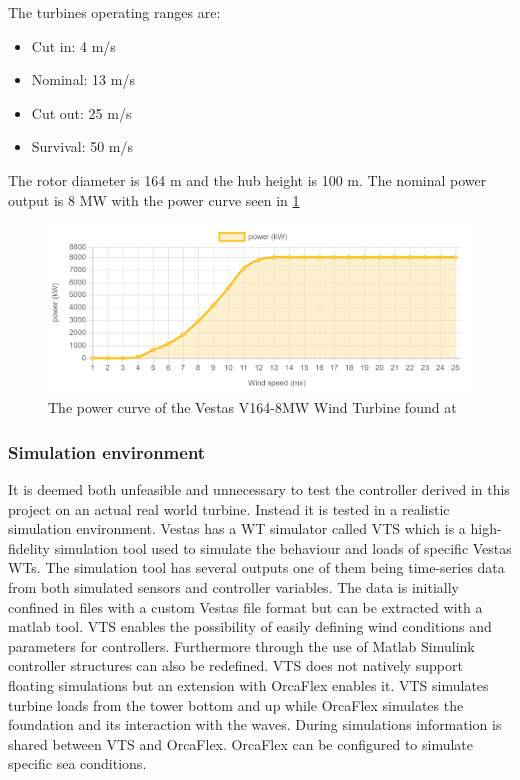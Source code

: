 The turbines operating ranges are:
\begin{itemize}
	\item Cut in: 4 m/s
	\item Nominal: 13 m/s
	\item Cut out: 25 m/s
	\item Survival: 50 m/s
\end{itemize}
The rotor diameter is 164 m and the hub height is 100 m. The nominal power output is 8 MW with the power curve seen in \cref{fig:v164_8mw_pc}
\begin{figure}[ht]
	\centering
	\includegraphics[width=0.95\linewidth]{Graphics/v164-8mw_powerCurve.PNG}
	\caption{The power curve of the Vestas V164-8MW Wind Turbine found at \cite{LucasBauer}}
	\label{fig:v164_8mw_pc}
\end{figure}

\subsubsection{Simulation environment}
It is deemed both unfeasible and unnecessary to test the controller derived in this project on an actual real world turbine. Instead it is tested in a realistic simulation environment. Vestas has a WT simulator called VTS which is a high-fidelity simulation tool used to simulate the behaviour and loads of specific Vestas WTs. The simulation tool has several outputs one of them being time-series data from both simulated sensors and controller variables. The data is initially confined in files with a custom Vestas file format but can be extracted with a matlab tool. VTS enables the possibility of easily defining wind conditions and parameters for controllers. Furthermore through the use of Matlab Simulink controller structures can also be redefined. VTS does not natively support floating simulations but an extension with OrcaFlex enables it. VTS simulates turbine loads from the tower bottom and up while OrcaFlex simulates the foundation and its interaction with the waves. During simulations information is shared between VTS and OrcaFlex. OrcaFlex can be configured to simulate specific sea conditions.

